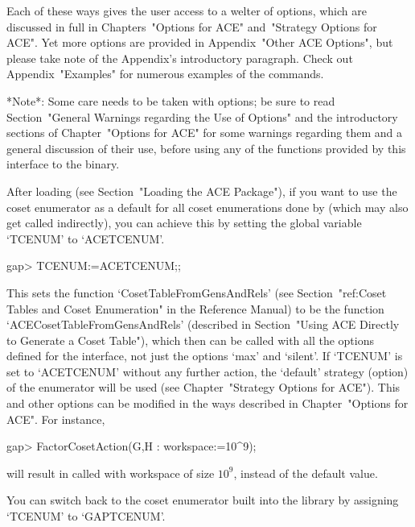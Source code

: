 \endlist

Each of these ways gives the user access to a welter of options, which
are discussed in full  in  Chapters~"Options  for  ACE"  and~"Strategy
Options for ACE". Yet more options are provided in Appendix~"Other ACE
Options",  but  please  take  note  of  the  Appendix's   introductory
paragraph. Check out Appendix~"Examples" for numerous examples of  the
{\ACE} commands.

*Note*: Some care needs to be taken with  options;  be  sure  to  read
Section~"General Warnings  regarding  the  Use  of  Options"  and  the
introductory sections of Chapter~"Options for ACE" for  some  warnings
regarding them and a general discussion of their use, before using any
of the functions provided by this interface to the {\ACE} binary.


After loading {\ACE} (see Section~"Loading the ACE Package"),  if  you
want to use the {\ACE} coset enumerator as a  default  for  all  coset
enumerations done by {\GAP} (which may also  get  called  indirectly),
you can achieve this  by  setting  the  global  variable  `TCENUM'  to
`ACETCENUM'.

\beginexample
gap> TCENUM:=ACETCENUM;;

\endexample

This    sets    the    function    `CosetTableFromGensAndRels'    (see
Section~"ref:Coset  Tables  and  Coset  Enumeration"  in  the   {\GAP}
Reference Manual) to be  the  function  `ACECosetTableFromGensAndRels'
(described in Section~"Using ACE Directly to Generate a Coset Table"),
which then can be called with all the options defined for  the  {\ACE}
interface, not just the options `max' and `silent'. If `TCENUM' is set
to `ACETCENUM' without any  further  action,  the  `default'  strategy
(option) of the {\ACE} enumerator will be used (see  Chapter~"Strategy
Options for ACE"). This and other options can be modified in the  ways 
described in Chapter~"Options for ACE". For instance,

\beginexample 
gap> FactorCosetAction(G,H : workspace:=10^9);

\endexample

will result in {\ACE} called with workspace of size $10^9$, instead of
the default value.

You can switch back to the coset  enumerator  built  into  the  {\GAP}
library by assigning `TCENUM' to `GAPTCENUM'.

